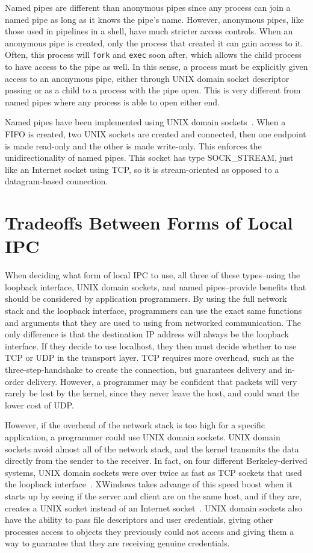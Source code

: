 Named pipes are different than anonymous pipes since any process can join a named pipe as long as it knows the pipe's name.  However, anonymous pipes, like those used in pipelines in a shell, have much stricter access controls.  When an anonymous pipe is created, only the process that created it can gain access to it.  Often, this process will \texttt{fork} and \texttt{exec} soon after, which allows the child process to have access to the pipe as well.  In this sense, a process must be explicitly given access to an anonymous pipe, either through UNIX domain socket descriptor passing or as a child to a process with the pipe open.  This is very different from named pipes where any process is able to open either end.

Named pipes have been implemented using UNIX domain sockets~\cite[p 1147]{singh2006mac}.  When a FIFO is created, two UNIX sockets are created and connected, then one endpoint is made read-only and the other is made write-only.  This enforces the unidirectionality of named pipes.  This socket has type SOCK\_STREAM, just like an Internet socket using TCP, so it is stream-oriented as opposed to a datagram-based connection.

\section{Tradeoffs Between Forms of Local IPC}
\label{sec:localIPCTradeoffs}
When deciding what form of local IPC to use, all three of these types--using the loopback interface, UNIX domain sockets, and named pipes--provide benefits that should be considered by application programmers.  By using the full network stack and the loopback interface, programmers can use the exact same functions and arguments that they are used to using from networked communication.  The only difference is that the destination IP address will always be the loopback interface.  If they decide to use localhost, they then must decide whether to use TCP or UDP in the transport layer.  TCP requires more overhead, such as the three-step-handshake to create the connection, but guarantees delivery and in-order delivery.  However, a programmer may be confident that packets will very rarely be lost by the kernel, since they never leave the host, and could want the lower cost of UDP.

However, if the overhead of the network stack is too high for a specific application, a programmer could use UNIX domain sockets.  UNIX domain sockets avoid almost all of the network stack, and the kernel transmits the data directly from the sender to the receiver.  In fact, on four different Berkeley-derived systems, UNIX domain sockets were over twice as fast as TCP sockets that used the loopback interface~\cite[p 223--224]{Stevens:1997:UNP:522800}.  XWindows takes advange of this speed boost when it starts up by seeing if the server and client are on the same host, and if they are, creates a UNIX socket instead of an Internet socket~\cite[p 373]{Stevens:1997:UNP:522800}.  UNIX domain sockets also have the ability to pass file descriptors and user credentials, giving other processes access to objects they previously could not access and giving them a way to guarantee that they are receiving genuine credentials.

